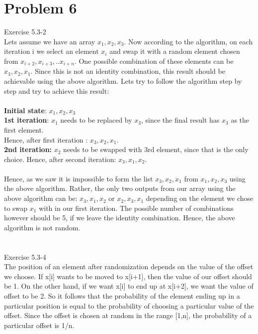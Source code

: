 \documentclass[10pt]{article}
\begin{document}
\section{Problem 6}
Exercise 5.3-2\\
Lets assume we have an array $x_1, x_2, x_3$. Now according to the algorithm, on each iteration i we select an element $x_i$ and swap it with a random element chosen from $x_{i+2}, x_{i+3}, .. x_{i+n}$. One possible combination of these elements can be $x_3, x_2, x_1$. Since this is not an identity combination, this result should be achievable using the above algorithm. Lets try to follow the algorithm step by step and try to achieve this result:\\\\
\textbf{Initial state}: $x_1, x_2, x_3$\\
\textbf{1st iteration}: $x_1$ needs to be replaced by $x_3$, since the final result has $x_3$ as the first element.\\
Hence, after first iteration : $x_3, x_2, x_1$.\\
\textbf{2nd iteration: } $x_2$ needs to be swapped with 3rd element, since that is the only choice. Hence, after second iteration: $x_3, x_1, x_2$.\\\\
Hence, as we saw it is impossible to form the list $x_3, x_2, x_1$ from $x_1, x_2, x_3$ using the above algorithm. Rather, the only two outputs from our array using the above algorithm can be: $x_3, x_1, x_2$ or $x_2, x_3, x_1$ depending on the element we chose to swap $x_1$ with in our first iteration. The possible number of combinations however should be 5, if we leave the identity combination. Hence, the above algorithm is not random.\\\\\\
Exercise 5.3-4\\
The position of an element after randomization depends on the value of the offset we choose. If x[i] wants to be moved to x[i+1], then the value of our offset should be 1. On the other hand, if we want x[i] to end up at x[i+2], we want the value of offset to be 2. So it follows that the probability of the element ending up in a particular position is equal to the probability of choosing a particular value of the offset. Since the offset is chosen at random in the range [1,n], the probability of a particular offset is 1/n.\\\\
\end{document}

